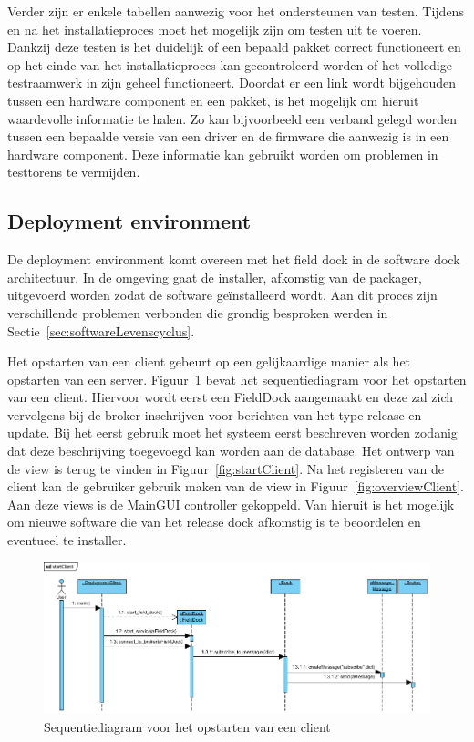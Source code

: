 Verder zijn er enkele tabellen aanwezig voor het ondersteunen van testen.
Tijdens en na het installatieproces moet het mogelijk zijn om testen uit te voeren.
Dankzij deze testen is het duidelijk of een bepaald pakket correct functioneert en op het einde van het installatieproces kan gecontroleerd worden of het volledige testraamwerk in zijn geheel functioneert.
Doordat er een link wordt bijgehouden tussen een hardware component en een pakket, is het mogelijk om hieruit waardevolle informatie te halen.
Zo kan bijvoorbeeld een verband gelegd worden tussen een bepaalde versie van een driver en de firmware die aanwezig is in een hardware component.
Deze informatie kan gebruikt worden om problemen in testtorens te vermijden.

\subsection{Deployment environment}
De deployment environment komt overeen met het field dock in de software dock architectuur.
In de omgeving gaat de installer, afkomstig van de packager, uitgevoerd worden zodat de software geïnstalleerd wordt.
Aan dit proces zijn verschillende problemen verbonden die grondig besproken werden in Sectie~\ref{sec:softwareLevenscyclus}.

Het opstarten van een client gebeurt op een gelijkaardige manier als het opstarten van een server.
Figuur~\ref{fig:seqClient} bevat het sequentiediagram voor het opstarten van een client.
Hiervoor wordt eerst een FieldDock aangemaakt en deze zal zich vervolgens bij de broker inschrijven voor berichten van het type release en update.
Bij het eerst gebruik moet het systeem eerst beschreven worden zodanig dat deze beschrijving toegevoegd kan worden aan de database.
Het ontwerp van de view is terug te vinden in Figuur~\ref{fig:startClient}.
Na het registeren van de client kan de gebruiker gebruik maken van de view in Figuur~\ref{fig:overviewClient}.
Aan deze views is de MainGUI controller gekoppeld.
Van hieruit is het mogelijk om nieuwe software die van het release dock afkomstig is te beoordelen en eventueel te installer.

\begin{figure}
\includegraphics[width=\textwidth,height=\textheight,keepaspectratio]{afbeelding/seqStartClient.png}
\centering
\caption{Sequentiediagram voor het opstarten van een client}
\label{fig:seqClient}
\end{figure}

